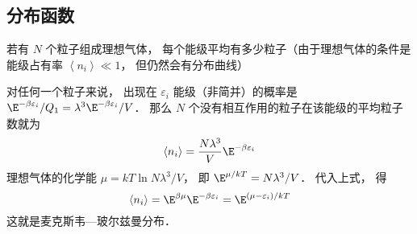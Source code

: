 \subsection{分布函数}
若有 $N$ 个粒子组成理想气体， 每个能级平均有多少粒子（由于理想气体的条件是能级占有率 $\left\langle {{n_i}} \right\rangle \ll 1$，  但仍然会有分布曲线）

对任何一个粒子来说， 出现在 ${\varepsilon _i}$ 能级（非简并）的概率是 ${{{\E^{ - \beta {\varepsilon _i}}}}}/{{{Q_1}}} = {{{\lambda ^3}}}{\E^{ - \beta {\varepsilon _i}}}/{V}$．  那么 $N$ 个没有相互作用的粒子在该能级的平均粒子数就为
\begin{equation}
  \left\langle {{n_i}} \right\rangle  = \frac{{N{\lambda ^3}}}{V}{\E^{ - \beta {\varepsilon _i}}}
\end{equation}
理想气体的化学能 $\mu  = kT\ln {{N{\lambda ^3}}}/{V}$，  即 ${\E^{\mu/kT}} = {{N{\lambda ^3}}}/{V}$．  代入上式， 得
\begin{equation}
  \left\langle {{n_i}} \right\rangle  = {\E^{\beta \mu }}{\E^{ - \beta {\varepsilon _i}}} = {\E^{(\mu - \varepsilon_i)/kT}}
\end{equation}
这就是麦克斯韦—玻尔兹曼分布．

